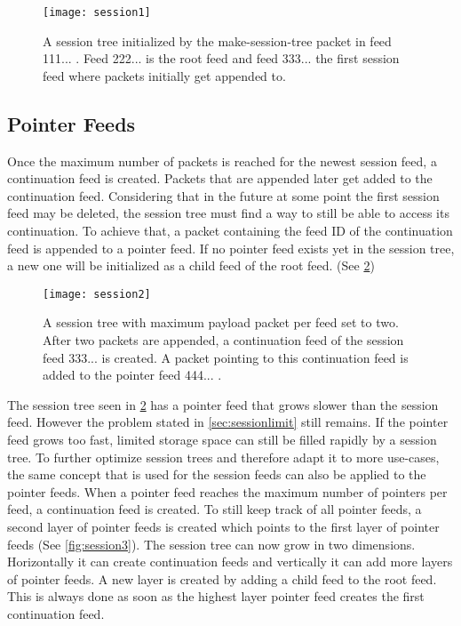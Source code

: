 \begin{figure}
\centering
\texttt{[image: session1]}
\caption{A session tree initialized by the make-session-tree packet in feed 111... . Feed 222... is the root feed and feed 333... the first session feed where packets initially get appended to.}
\label{fig:session1}
\end{figure}

\subsection{Pointer Feeds}
Once the maximum number of packets is reached for the newest session feed, a continuation feed is created. Packets that are appended later get added to the continuation feed. Considering that in the future at some point the first session feed may be deleted, the session tree must find a way to still be able to access its continuation. To achieve that, a packet containing the feed ID of the continuation feed is appended to a pointer feed. If no pointer feed exists yet in the session tree, a new one will be initialized as a child feed of the root feed. (See \cref{fig:session2})

\begin{figure}
\centering
\texttt{[image: session2]}
\caption{A session tree with maximum payload packet per feed set to two. After two packets are appended, a continuation feed of the session feed 333... is created. A packet pointing to this continuation feed is added to the pointer feed 444... .}
\label{fig:session2}
\end{figure}

The session tree seen in \cref{fig:session2} has a pointer feed that grows slower than the session feed. However the problem stated in \cref{sec:sessionlimit} still remains. If the pointer feed grows too fast, limited storage space can still be filled rapidly by a session tree. To further optimize session trees and therefore adapt it to more use-cases, the same concept that is used for the session feeds can also be applied to the pointer feeds. When a pointer feed reaches the maximum number of pointers per feed, a continuation feed is created. To still keep track of all pointer feeds, a second layer of pointer feeds is created which points to the first layer of pointer feeds (See \cref{fig:session3}). The session tree can now grow in two dimensions. Horizontally it can create continuation feeds and vertically it can add more layers of pointer feeds. A new layer is created by adding a child feed to the root feed. This is always done as soon as the highest layer pointer feed creates the first continuation feed. 

